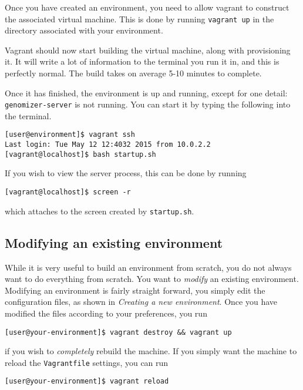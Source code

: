 Once you have created an environment, you need to allow vagrant to
construct the associated virtual machine. This is done by running
\texttt{vagrant\ up} in the directory associated with your environment.

Vagrant should now start building the virtual machine, along with
provisioning it. It will write a lot of information to the terminal you
run it in, and this is perfectly normal. The build takes on average 5-10
minutes to complete.

Once it has finished, the environment is up and running, except for one
detail: \texttt{genomizer-server} is not running. You can start it by
typing the following into the terminal.

\begin{verbatim}
[user@environment]$ vagrant ssh
Last login: Tue May 12 12:4032 2015 from 10.0.2.2
[vagrant@localhost]$ bash startup.sh
\end{verbatim}

If you wish to view the server process, this can be done by running

\begin{verbatim}
[vagrant@localhost]$ screen -r
\end{verbatim}

which attaches to the screen created by \texttt{startup.sh}.

\subsection{Modifying an existing
environment}\label{modifying-an-existing-environment}

While it is very useful to build an environment from scratch, you do not
always want to do everything from scratch. You want to \emph{modify} an
existing environment. Modifying an environment is fairly straight
forward, you simply edit the configuration files, as shown in
\emph{Creating a new environment}. Once you have modified the files
according to your preferences, you run

\begin{verbatim}
[user@your-environment]$ vagrant destroy && vagrant up
\end{verbatim}

if you wish to \emph{completely} rebuild the machine. If you simply want
the machine to reload the \texttt{Vagrantfile} settings, you can run

\begin{verbatim}
[user@your-environment]$ vagrant reload
\end{verbatim}

